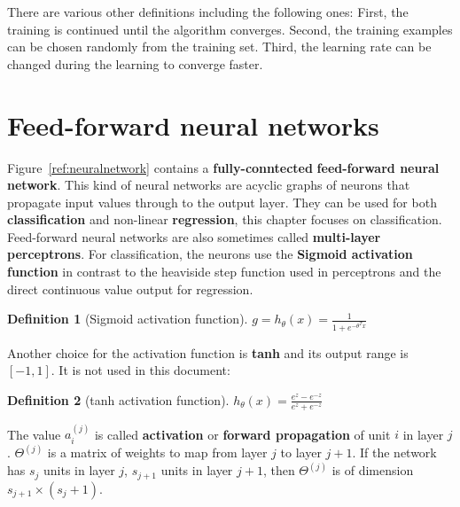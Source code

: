 \documentclass{report}
\newtheorem{definition}{Definition}[section]
\begin{document}
There are various other definitions including the following ones:
First, the training is continued until the algorithm converges.
Second, the training examples can be chosen randomly from the training set.
Third, the learning rate can be changed during the learning to converge faster.


\section{Feed-forward neural networks}
Figure~\ref{ref:neuralnetwork} contains a {\bf fully-conntected} {\bf feed-forward neural network}.
This kind of neural networks are acyclic graphs of neurons that propagate input values through to the output layer.
They can be used for both {\bf classification} and non-linear {\bf regression}, this chapter focuses on classification.
Feed-forward neural networks are also sometimes called {\bf multi-layer perceptrons}.
For classification, the neurons use the {\bf Sigmoid activation function} in contrast to the heaviside step function used in perceptrons and the direct continuous value output for regression.

\begin{definition}[Sigmoid activation function]
$g = h_\theta(x) = \frac{1}{1+e^{-\theta^{T}x}}$
\end{definition}

Another choice for the activation function is {\bf tanh} and its output range is $[-1,1]$. It is not used in this document:
\begin{definition}[tanh activation function]
$h_\theta(x) = \frac{e^z - e^{-z}}{e^z + e^{-z}}$
\end{definition}


The value $a_i^{(j)}$ is called {\bf activation} or {\bf forward propagation} of unit $i$ in layer $j$.
$\Theta^{(j)}$ is a matrix of weights to map from layer $j$ to layer $j+1$.
If the network has $s_j$ units in layer $j$, $s_{j+1}$ units in layer $j+1$, then $\Theta^{(j)}$ is of dimension $s_{j+1}\times (s_j + 1)$. \\
\end{document}
